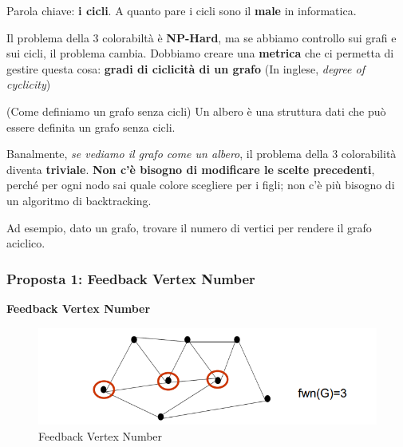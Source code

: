 Parola chiave: \textbf{i cicli}. A quanto pare i cicli sono il \textbf{male} in
informatica.

Il problema della 3 colorabiltà è \textbf{NP-Hard}, ma se abbiamo controllo sui
grafi e sui cicli, il problema cambia. Dobbiamo creare una \textbf{metrica} che
ci permetta di gestire questa cosa: \textbf{gradi di ciclicità di un grafo} (In
inglese, \textit{degree of cyclicity})

\begin{domanda}(Come definiamo un grafo senza cicli)
    Un albero è una struttura dati che può essere definita un grafo senza cicli.
\end{domanda}

Banalmente, \textit{se vediamo il grafo come un albero}, il problema della 3
colorabilità diventa \textbf{triviale}. \textbf{Non c'è bisogno di modificare
    le scelte precedenti}, perché per ogni nodo sai quale colore scegliere per i
figli; non c'è più bisogno di un algoritmo di backtracking.


\begin{figure}[H]
    \begin{center}
    \end{center}
\end{figure}

Ad esempio, dato un grafo, trovare il numero di vertici per rendere il grafo
aciclico.

\subsubsection{Proposta 1: Feedback Vertex Number}
\textbf{Feedback Vertex Number}
\begin{figure}[H]
    \centering
    \includegraphics[width=0.7\linewidth]{chapters/images/fixed k.png}
    \caption{Feedback Vertex Number}
    \label{fig:2}
\end{figure}


